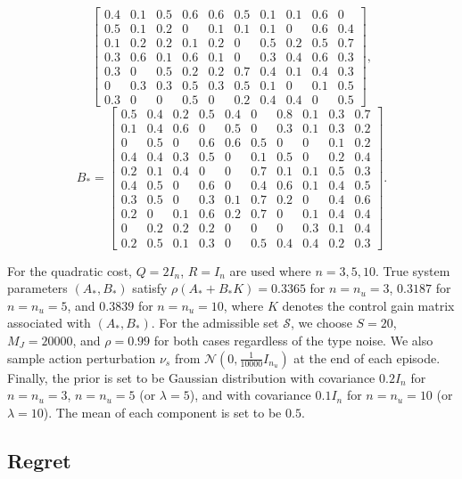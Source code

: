 \documentclass[11pt]{article}
\theoremstyle{plain}
\theoremstyle{definition}
\theoremstyle{remark}
\begin{document}
\begin{itemize}
\begin{equation*}
\begin{bmatrix}
    0.4&0.1&0.5&0.6&0.6&0.5&0.1&0.1&0.6&0\\
    0.5&0.1&0.2&0&0.1&0.1&0.1&0&0.6&0.4\\
    0.1&0.2&0.2&0.1&0.2&0&0.5&0.2&0.5&0.7\\
    0.3&0.6&0.1&0.6&0.1&0&0.3&0.4&0.6&0.3\\
    0.3&0&0.5&0.2&0.2&0.7&0.4&0.1&0.4&0.3\\
    0&0.3&0.3&0.5&0.3&0.5&0.1&0&0.1&0.5\\
    0.3&0&0&0.5&0&0.2&0.4&0.4&0&0.5
  \end{bmatrix},
\end{equation*}
\begin{equation*}
    B_*=
  \begin{bmatrix}
    0.5  & 0.4 & 0.2& 0.5 &0.4&0&0.8&0.1&0.3&0.7\\
    0.1 & 0.4 & 0.6 &0 &0.5 &0&0.3&0.1&0.3&0.2\\
    0 & 0.5 & 0 &0.6 &0.6 &0.5&0&0&0.1&0.2\\
    0.4 & 0.4 & 0.3 & 0.5 &0 & 0.1 &0.5 &0 &0.2 &0.4\\
    0.2 & 0.1 & 0.4 & 0 & 0 & 0.7 & 0.1 &0.1 &0.5 &0.3\\
    0.4 &0.5 &0 &0.6 &0 & 0.4 & 0.6 &0.1 &0.4 &0.5\\
    0.3&0.5&0&0.3&0.1&0.7&0.2&0&0.4&0.6\\
    0.2&0&0.1&0.6&0.2&0.7&0&0.1&0.4&0.4\\
    0&0.2&0.2&0.2&0&0&0&0.3&0.1&0.4\\
    0.2&0.5&0.1&0.3&0&0.5&0.4&0.4&0.2&0.3
  \end{bmatrix}.
\end{equation*}
\end{itemize}
 For the quadratic cost, $Q=2I_{n}$, $R=I_{n}$ are used where $n=3,5,10$. True system parameters $(A_*,B_*)$ satisfy $\rho(A_*+B_*K)=0.3365$ for $n=n_u=3$, $0.3187$ for $n=n_u=5$, and $0.3839$ for $n=n_u=10$, where $K$ denotes the control gain matrix associated with $(A_*,B_*)$. For the admissible set $\mathcal{S}$, we choose $S=20$, $M_J=20000$, and $\rho=0.99$ for both  cases regardless of the type noise. We also sample action perturbation $\nu_s$ from $\mathcal{N}(0,\frac{1}{10000}I_{n_u})$ at the end of each episode. Finally, the prior is set to be Gaussian distribution with covariance $0.2 I_n$ for $n=n_u=3$, $n=n_u=5$ (or $\lambda=5$), and with covariance $0.1 I_n$ for $n=n_u=10$ (or $\lambda=10$). The mean of each component is set to be $0.5$.

\subsection{Regret}
\end{document}
